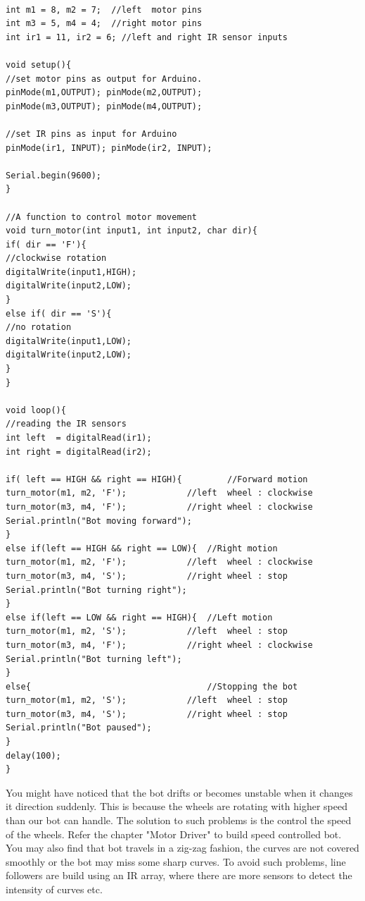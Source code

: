 \begin{lstlisting}[style=CStyle]

int m1 = 8, m2 = 7;  //left  motor pins
int m3 = 5, m4 = 4;  //right motor pins
int ir1 = 11, ir2 = 6; //left and right IR sensor inputs

void setup(){
//set motor pins as output for Arduino.
pinMode(m1,OUTPUT); pinMode(m2,OUTPUT);
pinMode(m3,OUTPUT); pinMode(m4,OUTPUT);

//set IR pins as input for Arduino
pinMode(ir1, INPUT); pinMode(ir2, INPUT);

Serial.begin(9600);
}

//A function to control motor movement
void turn_motor(int input1, int input2, char dir){
if( dir == 'F'){
//clockwise rotation
digitalWrite(input1,HIGH);
digitalWrite(input2,LOW);
}
else if( dir == 'S'){
//no rotation
digitalWrite(input1,LOW);
digitalWrite(input2,LOW);
}
}

void loop(){
//reading the IR sensors
int left  = digitalRead(ir1);
int right = digitalRead(ir2);

if( left == HIGH && right == HIGH){ 		//Forward motion
turn_motor(m1, m2, 'F');  			//left  wheel : clockwise
turn_motor(m3, m4, 'F');  			//right wheel : clockwise
Serial.println("Bot moving forward");
}
else if(left == HIGH && right == LOW){	//Right motion
turn_motor(m1, m2, 'F');  			//left  wheel : clockwise
turn_motor(m3, m4, 'S');  			//right wheel : stop
Serial.println("Bot turning right");
}
else if(left == LOW && right == HIGH){	//Left motion
turn_motor(m1, m2, 'S');  			//left  wheel : stop
turn_motor(m3, m4, 'F');  			//right wheel : clockwise
Serial.println("Bot turning left");
}
else{									//Stopping the bot
turn_motor(m1, m2, 'S');  			//left  wheel : stop
turn_motor(m3, m4, 'S');  			//right wheel : stop
Serial.println("Bot paused");
}
delay(100);
}
\end{lstlisting}
\vspace{1cm}
You might have noticed that the bot drifts or becomes unstable when it changes it direction suddenly. This is because the wheels are rotating with higher speed than our bot can handle. The solution to such problems is the control the speed of the wheels. Refer the chapter "Motor Driver" to build speed controlled bot. You may also find that bot travels in a zig-zag fashion, the curves are not covered smoothly or the bot may miss some sharp curves. To avoid such problems, line followers are build using an IR array, where there are more sensors to detect the intensity of curves etc. 
\vspace{0.5cm}
